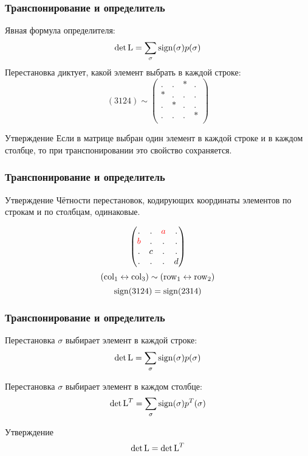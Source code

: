 \begin{frame}
    \frametitle{Транспонирование и определитель}

    Явная формула определителя:
    \[    
    \det \operatorname{L} = \sum_{\sigma} \operatorname{sign}(\sigma) p(\sigma) 
    \]
    \pause
    Перестановка диктует, какой элемент выбрать в каждой строке:
    \[
    (3124) \sim \begin{pmatrix}
    . & . & * & . \\
    * & . & . & . \\
    . & * & . & . \\
    . & . & . & * \\
    \end{pmatrix}
    \]
    \pause
    \begin{block}{Утверждение}
        Если в матрице выбран один элемент в каждой строке и в каждом столбце, то при транспонировании это свойство сохраняется.
    \end{block}

\end{frame}

\begin{frame}
\frametitle{Транспонирование и определитель}

\begin{block}{Утверждение}
    Чётности перестановок, кодирующих координаты элементов по строкам и по столбцам, одинаковые.
\end{block}
    \[
        \begin{pmatrix}
    . & . & \textcolor{red}{a} & . \\
    \textcolor{red}{b} & . & . & . \\
    . & c & . & . \\
    . & . & . & d \\
    \end{pmatrix}
    \]   
    \[
        (\operatorname{col}_1 \leftrightarrow \operatorname{col}_3) \sim (\operatorname{row}_1 \leftrightarrow \operatorname{row}_2)
    \]
    \pause
    \[
        \operatorname{sign}(3124) = \operatorname{sign}(2314)
    \]
\end{frame}



\begin{frame}
    \frametitle{Транспонирование и определитель}

Перестановка $\sigma$ выбирает элемент в каждой строке:
\[    
\det \operatorname{L} = \sum_{\sigma} \operatorname{sign}(\sigma) p(\sigma) 
\]

Перестановка $\sigma$ выбирает элемент в каждом столбце:
\[    
\det \operatorname{L}^T = \sum_{\sigma} \operatorname{sign}(\sigma) p^T(\sigma)
\]

\pause

\begin{block}{Утверждение}
\[
    \det \operatorname{L} = \det \operatorname{L}^T
\]
\end{block}

\end{frame}


